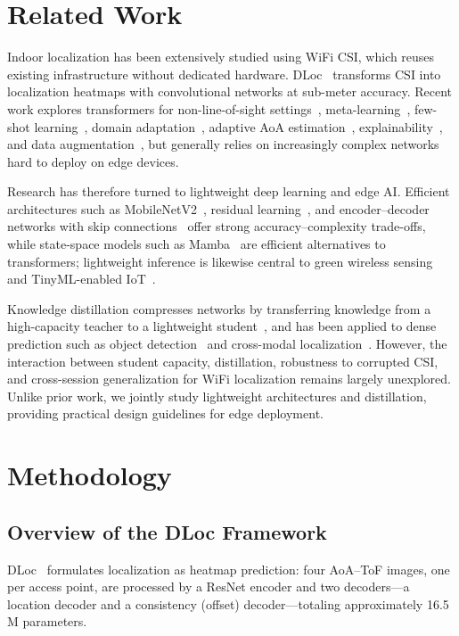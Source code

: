 \documentclass[conference,a4paper]{IEEEtran}
\begin{document}
\section{Related Work}
Indoor localization has been extensively studied using WiFi CSI, which reuses existing infrastructure without dedicated hardware. DLoc~\cite{ayyalasomayajula2020deep} transforms CSI into localization heatmaps with convolutional networks at sub-meter accuracy. Recent work explores transformers for non-line-of-sight settings~\cite{masrur2025transforming}, meta-learning~\cite{owfi2023meta}, few-shot learning~\cite{tiku2023fewshot}, domain adaptation~\cite{jiao2025robust}, adaptive AoA estimation~\cite{adaptiveaoa2026learning}, explainability~\cite{gufran2025towards}, and data augmentation~\cite{serbetci2024wireless}, but generally relies on increasingly complex networks hard to deploy on edge devices.

Research has therefore turned to lightweight deep learning and edge AI. Efficient architectures such as MobileNetV2~\cite{sandler2018mobilenetv2}, residual learning~\cite{he2016resnet}, and encoder--decoder networks with skip connections~\cite{ronneberger2015unet} offer strong accuracy--complexity trade-offs, while state-space models such as Mamba~\cite{gu2023mamba,visualmamba2024survey} are efficient alternatives to transformers; lightweight inference is likewise central to green wireless sensing~\cite{greenwireless2026survey} and TinyML-enabled IoT~\cite{tinyml2022iot}.

Knowledge distillation compresses networks by transferring knowledge from a high-capacity teacher to a lightweight student~\cite{hinton2015distilling}, and has been applied to dense prediction such as object detection~\cite{zheng2023localization} and cross-modal localization~\cite{nazaraliyev2025mambaloc}. However, the interaction between student capacity, distillation, robustness to corrupted CSI, and cross-session generalization for WiFi localization remains largely unexplored. Unlike prior work, we jointly study lightweight architectures and distillation, providing practical design guidelines for edge deployment.

\section{Methodology}
\subsection{Overview of the DLoc Framework}
DLoc~\cite{ayyalasomayajula2020deep} formulates localization as heatmap prediction: four AoA--ToF images, one per access point, are processed by a ResNet encoder and two decoders---a location decoder and a consistency (offset) decoder---totaling approximately 16.5\,M parameters.
\end{document}
